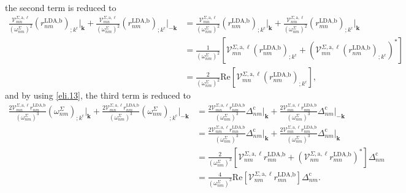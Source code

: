 \documentclass[letterpaper,aps]{revtex4}
\begin{document}
the second term is reduced to
\begin{align}\label{second_term_gen_deriv}
    \frac{\mathcal{V}^{\Sigma,\text{a},\ell}_{mn}}{(\omega^{\Sigma}_{nm})^{2}}
    \left(r^{\text{LDA,b}}_{nm}\right)_{;k^{\text{c}}}\vert_{\mathbf{k}}
+   \frac{\mathcal{V}^{\Sigma,\text{a},\ell}_{mn}}{(\omega^{\Sigma}_{nm})^{2}}
    \left(r^{\text{LDA,b}}_{nm}\right)_{;k^{\text{c}}}\vert_{-\mathbf{k}}
&=  \frac{\mathcal{V}^{\Sigma,\text{a},\ell}_{mn}}{(\omega^{\Sigma}_{nm})^{2}}
    \left(r^{\text{LDA,b}}_{nm}\right)_{;k^{\text{c}}}\vert_{\mathbf{k}}
+   \frac{\mathcal{V}^{\Sigma,\text{a},\ell}_{nm}}{(\omega^{\Sigma}_{nm})^{2}}
    \left(r^{\text{LDA,b}}_{mn}\right)_{;k^{\text{c}}}\vert_{\mathbf{k}}\nonumber\\
&=  \frac{1}{(\omega^{\Sigma}_{nm})^{2}}
    \left[\mathcal{V}^{\Sigma,\text{a},\ell}_{mn}
    \left(r^{\text{LDA,b}}_{nm}\right)_{;k^{\text{c}}}
+   \left(\mathcal{V}^{\Sigma,\text{a},\ell}_{mn}
    \left(r^{\text{LDA,b}}_{nm}\right)_{;k^{\text{c}}}\right)^*\right]
    \nonumber\\
&=  \frac{2}{(\omega^{\Sigma}_{nm})^{2}}\mathrm{Re}
    \left[\mathcal{V}^{\Sigma,\text{a},\ell}_{mn}
    \left(r^{\text{LDA,b}}_{nm}\right)_{;k^{\text{c}}}\right]
,
\end{align}
and by using \eqref{eli.13}, the third term is reduced to
\begin{align}\label{third_term_gen_deriv}
    \frac{2\mathcal{V}^{\Sigma,\text{a},\ell}_{mn}
    r^{\text{LDA,b}}_{nm}}{(\omega^{\Sigma}_{nm})^{3}}
    \left(\omega^{\Sigma}_{nm}\right)_{;k^{\text{c}}}\vert_{\mathbf{k}}
+   \frac{2\mathcal{V}^{\Sigma,\text{a},\ell}_{mn}
    r^{\text{LDA,b}}_{nm}}{(\omega^{\Sigma}_{nm})^{3}}
    \left(\omega^{\Sigma}_{nm}\right)_{;k^{\text{c}}}\vert_{-\mathbf{k}}
&=  \frac{2\mathcal{V}^{\Sigma,\text{a},\ell}_{mn}
    r^{\text{LDA,b}}_{nm}}{(\omega^{\Sigma}_{nm})^{3}}
    \Delta_{nm}^{\text{c}}\vert_{\mathbf{k}}
+   \frac{2\mathcal{V}^{\Sigma,\text{a},\ell}_{mn}
    r^{\text{LDA,b}}_{nm}}{(\omega^{\Sigma}_{nm})^{3}}
    \Delta_{nm}^{\text{c}}\vert_{-\mathbf{k}}\nonumber\\
&=  \frac{2\mathcal{V}^{\Sigma,\text{a},\ell}_{nm}
    r^{\text{LDA,b}}_{mn}}{(\omega^{\Sigma}_{nm})^{3}}
    \Delta_{nm}^{\text{c}}\vert_{\mathbf{k}}
+   \frac{2\mathcal{V}^{\Sigma,\text{a},\ell}_{mn}
    r^{\text{LDA,b}}_{nm}}{(\omega^{\Sigma}_{nm})^{3}}
    \Delta_{nm}^{\text{c}}\vert_{\mathbf{k}}\nonumber\\
&=  \frac{2}{(\omega^{\Sigma}_{nm})^{3}}
    \left[\mathcal{V}^{\Sigma,\text{a},\ell}_{nm}r^{\text{LDA,b}}_{mn}
+   \left(\mathcal{V}^{\Sigma,\text{a},\ell}_{nm}
    r^{\text{LDA,b}}_{mn}\right)^{*}\right]\Delta_{nm}^{\text{c}}\nonumber\\
&=  \frac{4}{(\omega^{\Sigma}_{nm})^{3}}\mathrm{Re}
    \left[\mathcal{V}^{\Sigma,\text{a},\ell}_{nm}r^{\text{LDA,b}}_{mn}\right]
    \Delta_{nm}^{\text{c}}
.
\end{align}
\end{document}
